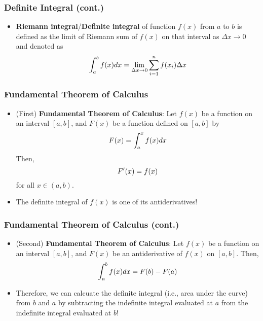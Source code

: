 \documentclass[pdflatex, 12pt]{beamer}
\begin{document}
\begin{frame}
\frametitle{Definite Integral (cont.)}
\begin{itemize}
\item \textbf{Riemann integral}/\textbf{Definite integral} of function $f(x)$ from $a$ to $b$ is defined as the limit of Riemann sum of $f(x)$ on that interval as $\Delta x \to 0$ and denoted as 
 \begin{equation}
 \int^b_a f(x)dx = \lim_{\Delta x \to 0} \sum_{i = 1}^{n} f(x_i) \Delta x \notag
 \end{equation}
\end{itemize}
\end{frame}

\begin{frame}
\frametitle{Fundamental Theorem of Calculus}
\begin{itemize}
\item (First) \textbf{Fundamental Theorem of Calculus}: Let $f(x)$ be a function on an interval $[a, b]$, and $F(x)$ be a function defined on $[a, b]$ by
 \begin{equation}
 F(x) = \int^x_a f(x)dx \notag
 \end{equation}
Then,
 \begin{equation}
 F'(x) = f(x) \notag
 \end{equation}
for all $x \in (a, b)$.
\vspace{0.4cm} 
\item The definite integral of $f(x)$ is one of its antiderivatives! 
\end{itemize}
\end{frame}

\begin{frame}
\frametitle{Fundamental Theorem of Calculus (cont.)}
\begin{itemize}
\item (Second) \textbf{Fundamental Theorem of Calculus}: Let $f(x)$ be a function on an interval $[a, b]$, and $F(x)$ be an antiderivative of $f(x)$ on $[a, b]$. Then,
 \begin{equation}
 \int^b_a f(x)dx = F(b) - F(a) \notag
 \end{equation}
\item Therefore, we can calcuate the definite integral (i.e., area under the curve) from $b$ and $a$ by subtracting the indefinite integral evaluated at $a$ from the indefinite integral evaluated at $b$! 
\end{itemize}
\end{frame}
\end{document}
